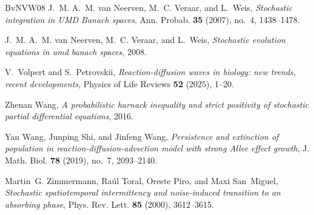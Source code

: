 \documentclass[final]{amsart}
\numberwithin{thm}{section}
\numberwithin{equation}{section}
\begin{document}
\begin{thebibliography}{BvNVW08}
J.~M. A.~M. van Neerven, M.~C. Veraar, and L.~Weis, \emph{Stochastic
  integration in {UMD} {B}anach spaces}, Ann. Probab. \textbf{35} (2007),
  no.~4, 1438--1478. 

J.~M. A.~M. van Neerven, M.~C. Veraar, and L.~Weis, \emph{Stochastic evolution
  equations in umd banach spaces}, 2008.

V.~Volpert and S.~Petrovskii, \emph{Reaction-diffusion waves in biology: new
  trends, recent developments}, Physics of Life Reviews \textbf{52} (2025),
  1--20.

Zhenan Wang, \emph{A probabilistic harnack inequality and strict positivity of
  stochastic partial differential equations}, 2016.

Yan Wang, Junping Shi, and Jinfeng Wang, \emph{Persistence and extinction of
  population in reaction-diffusion-advection model with strong {A}llee effect
  growth}, J. Math. Biol. \textbf{78} (2019), no.~7, 2093--2140. 

Martin~G. Zimmermann, Ra\'ul Toral, Oreste Piro, and Maxi San~Miguel,
  \emph{Stochastic spatiotemporal intermittency and noise-induced transition to
  an absorbing phase}, Phys. Rev. Lett. \textbf{85} (2000), 3612--3615.

\end{thebibliography}
\end{document}
